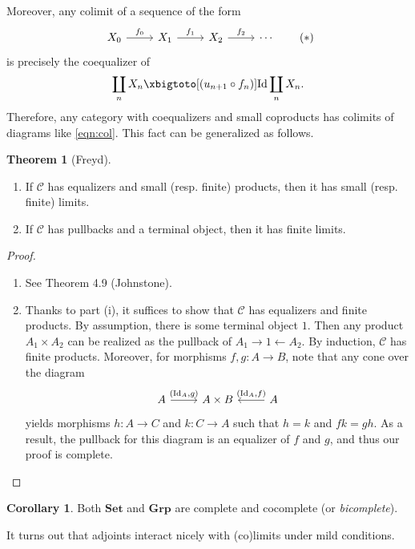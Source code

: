 \documentclass[10pt,letterpaper,cm]{nupset}
\theoremstyle{definition}
\theoremstyle{theorem}
\newtheorem{theorem}[definition]{Theorem}
\newtheorem{corollary}[definition]{Corollary}
\theoremstyle{remark}
\newcommand{\1}{\mathbf{1}}
\renewcommand{\c}{\mathscr{C}}
\newcommand{\0}{\vec 0}
\DeclareMathOperator{\id}{Id}
\begin{document}
Moreover, any colimit of a sequence of the form
\[ \label{eqn:col}
\begin{tikzcd}
X_0 \arrow[r, "f_0"] & X_1 \arrow[r, "f_1"] & X_2 \arrow[r, "f_2"] & \cdots
\end{tikzcd} \tag{$\ast$}
\] is precisely the coequalizer of
\[
\coprod_nX_n \xbigtoto[\left(u_{n+1}\circ f_n\right)]{\id} \coprod_nX_n.
\] Therefore, any category with coequalizers and small coproducts has colimits of diagrams like \eqref{eqn:col}. This fact can be generalized as follows.

\smallskip

\begin{theorem}[Freyd] $ $
\begin{enumerate}[label=(\roman*)]
\item If $\c$ has equalizers and small (resp. finite) products, then it has small (resp. finite) limits.
\item If $\c$ has pullbacks and a terminal object, then it has finite limits.
\end{enumerate}
\end{theorem}
\begin{proof} $ $
\begin{enumerate}
\item See Theorem 4.9 (Johnstone).
\item Thanks to part (i), it suffices to show that $\c$ has equalizers and finite products. By assumption, there is some terminal object $1$. Then any product $A_1 \times A_2$ can be realized as the pullback of $A_1 \rightarrow 1 \leftarrow A_2$. By induction, $\c$ has finite products. Moreover, for morphisms $f,g : A \to B$, note that any cone over the diagram 
\[
\begin{tikzcd}
A \arrow[r, "{\left(\id_A, g\right)}"] & A\times B & A \arrow[l, "{\left(\id_A, f\right)}"']
\end{tikzcd}
\] yields morphisms $h: A \to C$ and $k : C \to A$ such that $h=k$ and $fk = gh$. As a result, the pullback for this diagram is an equalizer of $f$ and $g$, and thus our proof is complete.
\end{enumerate}
\end{proof}

\begin{corollary}
Both $\mathbf{Set}$ and $\mathbf{Grp}$ are complete and cocomplete (or \textit{bicomplete}).
\end{corollary}

\medskip

It turns out that adjoints interact nicely with (co)limits under mild conditions.
\end{document}
